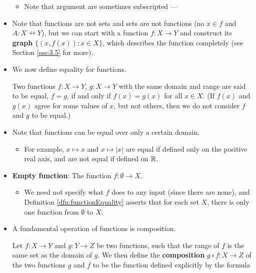 \documentclass[../main.tex]{subfiles}
\begin{document}
\begin{itemize}
\begin{itemize}
        \item Note that argument are sometimes subscripted --- 
    \end{itemize}
    \item Note that functions are not sets and sets are not functions (no $x\in f$ and $A:X\nrightarrow Y$), but we can start with a function $f:X\to Y$ and construct its \textbf{graph} $\{(x,f(x)):x\in X\}$, which describes the function completely (see Section \ref{sse:3.5} for more).
    \item We now define equality for functions.
    \begin{dfn}\label{dfn:functionEquality}
        Two functions $f:X\to Y$, $g:X\to Y$ with the same domain and range are said to be equal, $f=g$, if and only if $f(x)=g(x)$ for all $x\in X$. (If $f(x)$ and $g(x)$ agree for some values of $x$, but not others, then we do not consider $f$ and $g$ to be equal.)
    \end{dfn}
    \item Note that functions can be equal over only a certain domain.
    \begin{itemize}
        \item For example, $x\mapsto x$ and $x\mapsto|x|$ are equal if defined only on the positive real axis, and are not equal if defined on $\mathbb{R}$.
    \end{itemize}
    \item \textbf{Empty function}: The function $f:\emptyset\to X$.
    \begin{itemize}
        \item We need not specify what $f$ does to any input (since there are none), and Definition \ref{dfn:functionEquality} asserts that for each set $X$, there is only one function from $\emptyset$ to $X$.
    \end{itemize}
    \item A fundamental operation of functions is composition.
    \begin{dfn}[Composition]\label{dfn:composition}
        Let $f:X\to Y$ and $g:Y\to Z$ be two functions, such that the range of $f$ is the same set as the domain of $g$. We then define the \textbf{composition} $g\circ f:X\to Z$ of the two functions $g$ and $f$ to be the function defined explicitly by the formula
        \begin{equation*}

\end{equation*}
\end{dfn}
\end{itemize}
\end{document}
